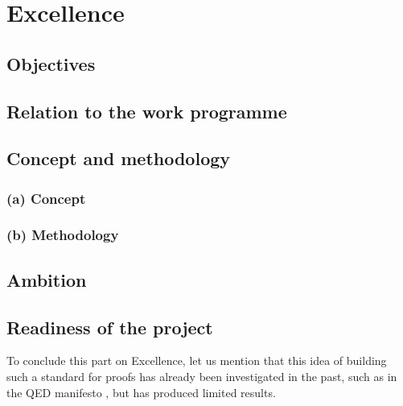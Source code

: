 \chapter{Excellence}



\section{Objectives}\label{objectives}



\section{Relation to the work programme}



\section{Concept and methodology}

\newcommand{\cmsection}[1]{\bigskip\par\noindent\stepcounter{cmsec}\currentpdfbookmark{--- #1}{\thecmsec}{\bf \large \underline{#1}}\medskip}

\subsection*{(a) Concept}\label{concept}



\subsection*{(b) Methodology}



\section{Ambition}



\section*{Readiness of the project}

To conclude this part on Excellence, let us mention that this idea of
building such a standard for proofs has already been investigated in
the past, such as in the QED manifesto \cite{Qed94}, but has produced
limited results.

